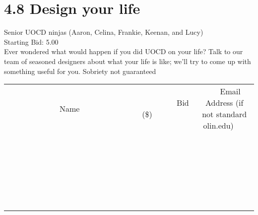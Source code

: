 \documentclass[11pt]{article}
\begin{document}
					\section*{4.8 Design your life}
					Senior UOCD ninjas (Aaron, Celina, Frankie, Keenan, and Lucy) \\
					Starting Bid: 5.00 \\
					Ever wondered what would happen if you did UOCD on your life? Talk to our team of seasoned designers about what your life is like; we'll try to come up with something useful for you. Sobriety not guaranteed \\
					[6ex]
					\begin{tabular}{c c c}
						~~~~~~~~~~~~~Name~~~~~~~~~~~~~ & ~~~~~~~~~Bid (\$)~~~~~~~~~ & ~~~Email Address (if not standard olin.edu)~~~ \\
				
 & & \\
\hline
 & & \\
\hline
 & & \\
\hline
 & & \\
\hline
 & & \\
\hline
 & & \\
\hline
 & & \\
\hline
 & & \\
\hline
 & & \\
\hline
 & & \\
\hline
 & & \\
\hline
 & & \\
\hline
 & & \\
\hline
 & & \\
\hline
 & & \\
\hline
 & & \\
\hline
 & & \\
\hline
 & & \\
\hline
 & & \\
\hline
 & & \\
\hline
 & & \\
\hline
 & & \\
\hline
 & & \\
\hline
 & & \\
\hline
 & & \\
\hline
 & & \\
\hline
					\end{tabular}
					\clearpage
				
\end{document}
